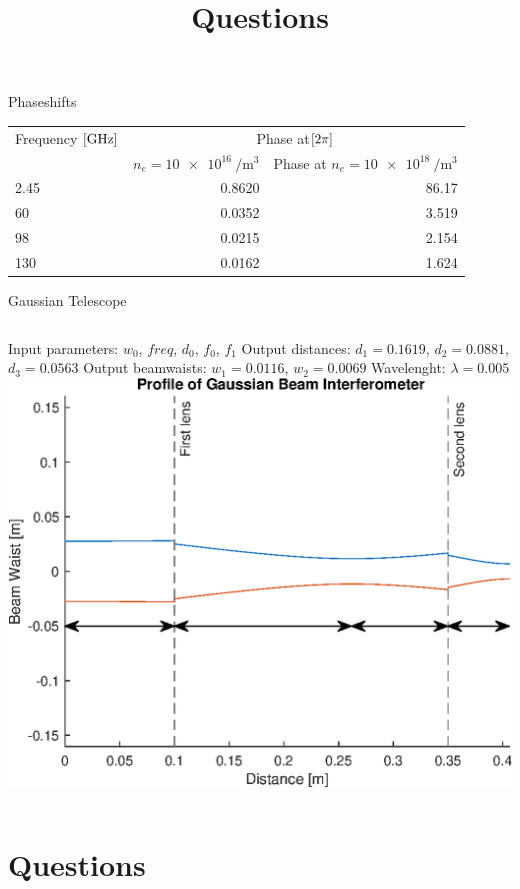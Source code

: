 \documentclass[hyperref={colorlinks=true,urlcolor=blue,linkcolor=.},aspectratio=1610,mathserif]{beamer}
\begin{document}
\begin{frame}{Phaseshifts}
	\centering
	\begin{table}
		\begin{tabular}{lrr}

			Frequency \(\bqty{\si{\giga\hertz}}\) & \multicolumn{2}{c}{Phase at\(\bqty{2\pi}\)}                                                 \\
			                                      & \(n_e=\SI{10e16}{\per\meter\cubed}\)        & Phase at \(n_e=\SI{10e18}{\per\meter\cubed}\) \\
			2.45                                  & 0.8620                                      & 86.17                                         \\
			60                                    & 0.0352                                      & 3.519                                         \\
			98                                    & 0.0215                                      & 2.154                                         \\
			130                                   & 0.0162                                      & 1.624                                         \\
		\end{tabular}
	\end{table}
\end{frame}
\begin{frame}{Gaussian Telescope}
	\begin{columns}
		Input parameters:
		\(w_0\), \(freq\), \(d_0\), \(f_0\), \(f_1\)
		Output distances:
		\(d_1 = 0.1619\), \(d_2 = 0.0881\), \(d_3 = 0.0563\)
		Output beamwaists:
		\(w_1 = 0.0116\), \(w_2 = 0.0069\)
		Wavelenght: \(\lambda=0.005\)
		\includegraphics[width=\textwidth]{MatlabFigures/Interferometer/Interferometer.eps}
	\end{columns}
\end{frame}
\section*{Questions}
\title{Questions}
\subtitle{}
\begin{frame}
	\titlepage
\end{frame}
\end{document}
